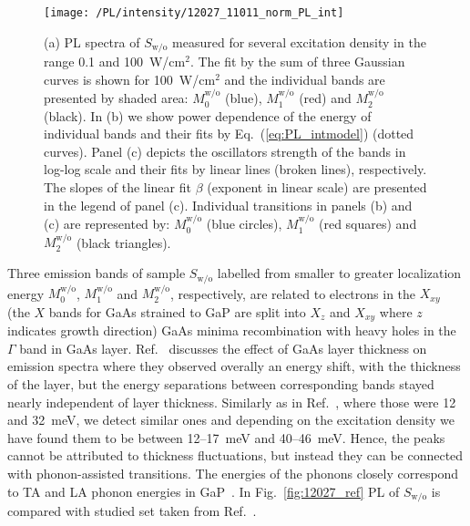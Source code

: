 \begin{figure}
	\centering
	\texttt{[image: /PL/intensity/12027\_11011\_norm\_PL\_int]}
	\caption{(a) PL spectra of $S_\mathrm{w/o}$ measured for several excitation density in the range 0.1 and 100~W/cm$^2$. The fit by the sum of three Gaussian curves is shown for 100~W/cm$^2$ and the individual bands are presented by shaded area: $M_0^\mathrm{w/o}$ (blue), $M_1^\mathrm{w/o}$ (red) and $M_2^\mathrm{w/o}$ (black). In (b) we show power dependence of the energy of individual bands and their fits by Eq.~(\ref{eq:PL_intmodel}) (dotted curves). Panel (c) depicts the oscillators strength of the bands in log-log scale and their fits by linear lines (broken lines), respectively. The slopes of the linear fit $\beta$ (exponent in linear scale) are presented in the legend of panel (c). Individual transitions in panels (b) and (c) are represented by: $M_0^\mathrm{w/o}$ (blue circles), $M_1^\mathrm{w/o}$ (red squares) and $M_2^\mathrm{w/o}$ (black triangles).}
	\label{fig:QD_wo_int}
\end{figure}
Three emission bands of sample $S_\mathrm{w/o}$ labelled from smaller to greater localization energy $M_0^\mathrm{w/o}$, $M_1^\mathrm{w/o}$ and $M_2^\mathrm{w/o}$, respectively, are related to electrons in the $X_{xy}$ (the $X$ bands for GaAs strained to GaP are split into $X_z$ and $X_{xy}$ where $z$ indicates growth direction) GaAs minima recombination with heavy holes in the $\Gamma$ band in GaAs layer. Ref.~\citep{Prieto_APL1997} discusses the effect of GaAs layer thickness on emission spectra where they observed overally an energy shift, with the thickness of the layer, but the energy separations between corresponding bands stayed nearly independent of layer thickness. Similarly as in Ref.~\citep{Prieto_APL1997}, where those were 12 and 32~meV, we detect similar ones and depending on the excitation density we have found them to be between 12--17~meV and 40--46~meV. Hence, the peaks cannot be attributed to thickness fluctuations, but instead they can be connected with phonon-assisted transitions. The energies of the phonons closely correspond to TA and LA phonon energies in GaP~\citep{Prieto_APL1997}. In Fig.~\ref{fig:12027_ref} PL of $S_\mathrm{w/o}$ is compared with studied set taken from Ref.~\citep{Prieto_APL1997}.



